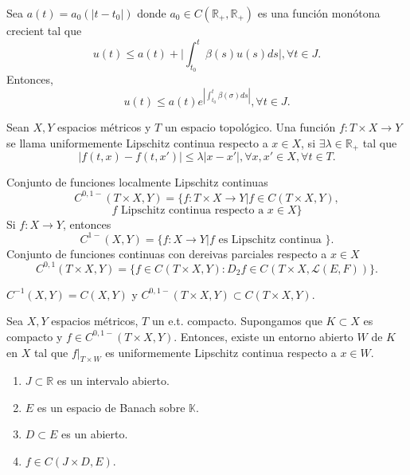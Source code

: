 \begin{cor}
  Sea $a(t) = a_{0}(| t -  t_{0} |)$ donde $a_{0} \in C(\mathbb{R}_{+}, \mathbb{R}_{+})$ es una función monótona crecient tal que
  \[ 
    u(t) \leq a(t) + \Big | \int_{t_{0}}^{t} \beta(s) u(s) ds \Big |, \forall t \in J. 
  \]
  Entonces, 
  \[ 
    u(t) \leq a(t) e^{| \int_{t_{0}}^{t} \beta(\sigma) ds |}, \forall t \in J. 
  \] 
\end{cor}

\begin{defn}
  Sean $X, Y$ espacios métricos y $T$ un espacio topológico. Una función $f: T \times X \to Y$ se llama uniformemente Lipschitz continua respecto a $x \in X$, si $\exists \lambda \in \mathbb{R}_{+}$ tal que 
  \[ 
    | f(t,x) - f(t,x') | \leq \lambda | x - x' |, \forall x,x' \in X, \forall t \in T. 
  \] 
\end{defn}

\begin{nota}
  Conjunto de funciones localmente Lipschitz continuas
  \[ 
    C^{0,1-}(T \times X, Y) = \{ f: T \times X \to Y | f \in C(T \times X, Y),
  \] 
  \[ 
     f \text{ Lipschitz continua respecto a } x \in X \}  
  \] 
  Si $f: X \to Y$, entonces
  \[ 
    C^{1-}(X,Y) = \{ f: X \to Y | f \text{ es Lipschitz continua } \} .
  \]
  Conjunto de funciones continuas con dereivas parciales respecto a $x \in X$
  \[ 
    C^{0,1}(T \times X, Y) = \{ f \in C^{}(T \times X, Y) : D_{2}f \in C^{}(T \times X, \mathcal{L}(E,F)) \}.
  \] 
\end{nota}

\begin{obs}
  $C^{-1}(X,Y) = C(X,Y)$ y $C^{0,1-}(T \times X, Y) \subset C(T \times X, Y)$.
\end{obs}

\begin{prop}
  Sea $X,Y$ espacios métricos, $T$ un e.t. compacto. Supongamos que $K \subset X$ es compacto y $f \in C^{0,1-}(T \times X, Y)$. Entonces, existe un entorno abierto $W$ de $K$ en $X$ tal que $f|_{T \times W}$ es uniformemente Lipschitz continua respecto a $x \in W$.
\end{prop}

\begin{nota}
  \begin{enumerate}[label=(\roman*)]
    \item $J \subset \mathbb{R}$ es un intervalo abierto.
    \item $E$ es un espacio de Banach sobre $\mathbb{K}$.
    \item $D \subset E$ es un abierto.
    \item $ f \in C(J \times D, E)$.
  \end{enumerate}
\end{nota}

